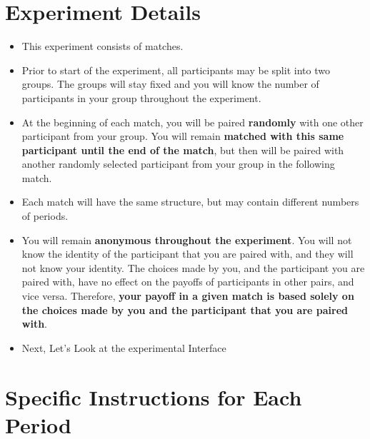 \documentclass[11pt]{article}
\newcommand{\dblbkt}[1]{}
\begin{document}
\section*{\dblbkt{3} Experiment Details} 
\begin{itemize} 
\item \dblbkt{1} This experiment consists of {\bf \numberOfMatches}  matches. 
\item \dblbkt{1} Prior to start of the experiment, all participants may be split into two groups. The groups will stay fixed and you will know the number of participants in your group throughout the experiment.
\item \dblbkt{1} At the beginning of each match, you will be paired {\bf randomly} with one other participant from your group.  You will remain {\bf matched with this same participant until the  end of the match}, but then will be paired with another randomly selected participant from your group in the following match.
\item Each match will have the same structure, \dblbkt{1} but may contain different numbers of periods. 
\item \dblbkt{1} You will remain {\bf anonymous throughout the experiment}.  You will not know the identity of the participant that you are paired with, and they will not know your identity. \dblbkt{1} The choices made by you, and the participant you are paired with, have no effect on the payoffs of participants in other pairs, and vice versa. Therefore, {\bf your payoff in a given match is based solely on the choices made by you and the participant that you are paired with}.
\item \dblbkt{5} Next, Let's Look at the experimental Interface \dblbkt{slnc 2000}
\end{itemize}


\section*{Specific Instructions for Each Period} 
\end{document}
